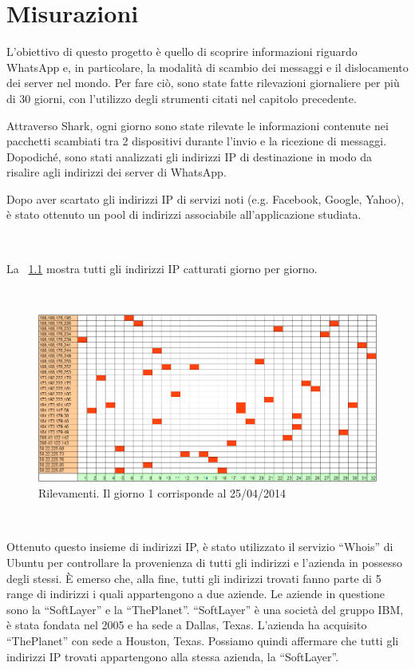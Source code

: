 \documentclass[a4paper,11pt]{book}
\begin{document}
\chapter{Misurazioni}

L'obiettivo di questo progetto \`e quello di scoprire informazioni riguardo WhatsApp e, in particolare, la modalità di scambio dei messaggi e il dislocamento dei server nel mondo.
Per fare ci\`o, sono state fatte rilevazioni giornaliere per pi\`u di 30 giorni, con l'utilizzo degli strumenti citati nel capitolo precedente.

Attraverso Shark, ogni giorno sono state rilevate le informazioni contenute nei pacchetti scambiati tra 2 dispositivi durante l'invio e la ricezione di messaggi.
Dopodich\'e, sono stati analizzati gli indirizzi IP di destinazione in modo da risalire agli indirizzi dei server di WhatsApp.

Dopo aver scartato gli indirizzi IP di servizi noti (e.g. Facebook, Google, Yahoo), è stato ottenuto un pool di indirizzi associabile all'applicazione studiata.

~

La \figurename ~\ref{fig:rilevazioni} mostra tutti gli indirizzi IP catturati giorno per giorno.  

~

\begin{figure}[!ht]
\centering
\includegraphics[scale = 0.7]{rilevazioni_30gg.png}
\caption{Rilevamenti. Il giorno 1 corrisponde al 25/04/2014}
\label{fig:rilevazioni}
\end{figure}

~

Ottenuto questo insieme di indirizzi IP, \`e stato utilizzato il servizio ``Whois'' di Ubuntu per controllare la provenienza di tutti gli indirizzi e l'azienda in possesso degli stessi.
\`E emerso che, alla fine, tutti gli indirizzi trovati fanno parte di 5 range di indirizzi i quali appartengono a due aziende. Le aziende in questione sono la ``SoftLayer'' e la ``ThePlanet''.
``SoftLayer'' \`e una societ\`a del gruppo IBM, \`e stata fondata nel 2005 e ha sede a Dallas, Texas. L'azienda ha acquisito ``ThePlanet'' con sede a Houston, Texas. 
Possiamo quindi affermare che tutti gli indirizzi IP trovati appartengono alla stessa azienda, la ``SoftLayer''.
\end{document}
